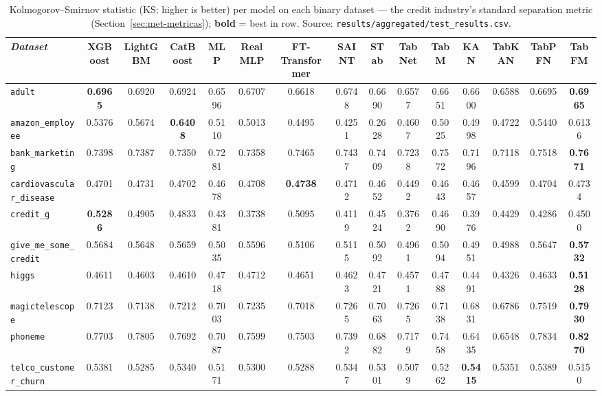 \begin{landscape}

\begin{table}[htbp]
\centering
\footnotesize
\setlength{\tabcolsep}{3pt}
\caption[KS statistic per dataset --- binary]{Kolmogorov--Smirnov statistic (KS; higher is better) per model on each binary dataset --- the credit industry's standard separation metric (Section~\ref{sec:met-metricas}); \textbf{bold} = best in row. Source: \texttt{results/\allowbreak aggregated/\allowbreak test\_\allowbreak results.\allowbreak csv}.}
\label{tab:app-ks}
\begin{tabular}{lcccccccccccccc}
\toprule
\emph{Dataset} & XGBoost & LightGBM & CatBoost & MLP & RealMLP & FT-Transformer & SAINT & STab & TabNet & TabM & KAN & TabKAN & TabPFN & TabFM \\
\midrule
\texttt{adult} & \textbf{0.6965} & 0.6920 & 0.6924 & 0.6596 & 0.6707 & 0.6618 & 0.6748 & 0.6690 & 0.6577 & 0.6651 & 0.6600 & 0.6588 & 0.6695 & \textbf{0.6965} \\
\texttt{amazon\_\allowbreak employee} & 0.5376 & 0.5674 & \textbf{0.6408} & 0.5110 & 0.5013 & 0.4495 & 0.4251 & 0.2628 & 0.4607 & 0.5025 & 0.4998 & 0.4722 & 0.5440 & 0.6136 \\
\texttt{bank\_\allowbreak marketing} & 0.7398 & 0.7387 & 0.7350 & 0.7281 & 0.7358 & 0.7465 & 0.7437 & 0.7409 & 0.7238 & 0.7572 & 0.7196 & 0.7118 & 0.7518 & \textbf{0.7671} \\
\texttt{cardiovascular\_\allowbreak disease} & 0.4701 & 0.4731 & 0.4702 & 0.4678 & 0.4708 & \textbf{0.4738} & 0.4712 & 0.4652 & 0.4492 & 0.4643 & 0.4657 & 0.4599 & 0.4704 & 0.4734 \\
\texttt{credit\_g} & \textbf{0.5286} & 0.4905 & 0.4833 & 0.4381 & 0.3738 & 0.5095 & 0.4119 & 0.4524 & 0.3762 & 0.4690 & 0.3976 & 0.4429 & 0.4286 & 0.4500 \\
\texttt{give\_\allowbreak me\_\allowbreak some\_\allowbreak credit} & 0.5684 & 0.5648 & 0.5659 & 0.5035 & 0.5596 & 0.5106 & 0.5115 & 0.5092 & 0.4961 & 0.5094 & 0.4951 & 0.4988 & 0.5647 & \textbf{0.5732} \\
\texttt{higgs} & 0.4611 & 0.4603 & 0.4610 & 0.4718 & 0.4712 & 0.4651 & 0.4623 & 0.4721 & 0.4571 & 0.4788 & 0.4491 & 0.4326 & 0.4633 & \textbf{0.5128} \\
\texttt{magictelescope} & 0.7123 & 0.7138 & 0.7212 & 0.7003 & 0.7235 & 0.7018 & 0.7265 & 0.7063 & 0.7265 & 0.7138 & 0.6831 & 0.6786 & 0.7519 & \textbf{0.7930} \\
\texttt{phoneme} & 0.7703 & 0.7805 & 0.7692 & 0.7087 & 0.7599 & 0.7503 & 0.7392 & 0.6882 & 0.7179 & 0.7458 & 0.6435 & 0.6548 & 0.7834 & \textbf{0.8270} \\
\texttt{telco\_\allowbreak customer\_\allowbreak churn} & 0.5381 & 0.5285 & 0.5340 & 0.5171 & 0.5300 & 0.5288 & 0.5347 & 0.5301 & 0.5079 & 0.5262 & \textbf{0.5415} & 0.5351 & 0.5389 & 0.5150 \\
\bottomrule
\end{tabular}
\end{table}

\end{landscape}

